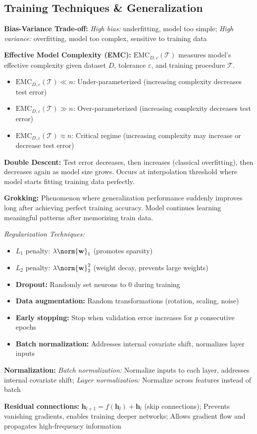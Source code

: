 \subsection{Training Techniques \& Generalization}

\textbf{Bias-Variance Trade-off:} \textit{High bias:} underfitting, model too simple; \textit{High variance:} overfitting, model too complex, sensitive to training data

\textbf{Effective Model Complexity (EMC):} $\text{EMC}_{D,\varepsilon}(\mathcal{T})$ measures model's effective complexity given dataset $D$, tolerance $\varepsilon$, and training procedure $\mathcal{T}$.

\begin{itemize}
    \item $\text{EMC}_{D,\varepsilon}(\mathcal{T}) \ll n$: Under-parameterized (increasing complexity decreases test error)
    \item $\text{EMC}_{D,\varepsilon}(\mathcal{T}) \gg n$: Over-parameterized (increasing complexity decreases test error)
    \item $\text{EMC}_{D,\varepsilon}(\mathcal{T}) \approx n$: Critical regime (increasing complexity may increase or decrease test error)
\end{itemize}

\textbf{Double Descent:} Test error decreases, then increases (classical overfitting), then decreases again as model size grows. Occurs at interpolation threshold where model starts fitting training data perfectly.

\textbf{Grokking:} Phenomenon where generalization performance suddenly improves long after achieving perfect training accuracy. Model continues learning meaningful patterns after memorizing train data.



\emph{Regularization Techniques:}
\begin{itemize}
    \item $L_1$ penalty: $\lambda \norm{\mathbf{w}}_1$ (promotes sparsity)
    \item $L_2$ penalty: $\lambda \norm{\mathbf{w}}_2^2$ (weight decay, prevents large weights)
    \item \textbf{Dropout:} Randomly set neurons to $0$ during training
    \item \textbf{Data augmentation:} Random transformations (rotation, scaling, noise)
    \item \textbf{Early stopping:} Stop when validation error increases for $p$ consecutive epochs
    \item \textbf{Batch normalization:} Addresses internal covariate shift, normalizes layer inputs
\end{itemize}

\textbf{Normalization:} \textit{Batch normalization:} Normalize inputs to each layer, addresses internal covariate shift; \textit{Layer normalization:} Normalize across features instead of batch

\textbf{Residual connections:} $\mathbf{h}_{l+1} = f(\mathbf{h}_l) + \mathbf{h}_l$ (skip connections); Prevents vanishing gradients, enables training deeper networks; Allows gradient flow and propagates high-frequency information


